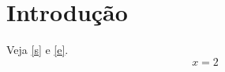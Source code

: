 \documentclass{article}
\begin{document}
\section{Introdução}\label{s}
Veja \autoref{s} e \autoref{e}.
\begin{equation}x = 2\label{e}\end{equation}
\end{document}
